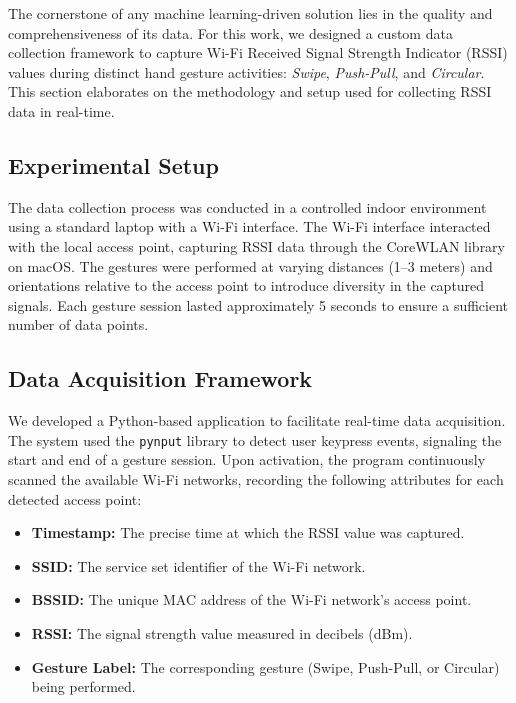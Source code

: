 \documentclass[10pt,twocolumn,letterpaper]{article}
\begin{document}
The cornerstone of any machine learning-driven solution lies in the quality and comprehensiveness of its data. For this work, we designed a custom data collection framework to capture Wi-Fi Received Signal Strength Indicator (RSSI) values during distinct hand gesture activities: \textit{Swipe}, \textit{Push-Pull}, and \textit{Circular}. This section elaborates on the methodology and setup used for collecting RSSI data in real-time.

\subsection{Experimental Setup}

The data collection process was conducted in a controlled indoor environment using a standard laptop with a Wi-Fi interface. The Wi-Fi interface interacted with the local access point, capturing RSSI data through the CoreWLAN library on macOS. The gestures were performed at varying distances (1–3 meters) and orientations relative to the access point to introduce diversity in the captured signals. Each gesture session lasted approximately 5 seconds to ensure a sufficient number of data points.

\subsection{Data Acquisition Framework}

We developed a Python-based application to facilitate real-time data acquisition. The system used the \texttt{pynput} library to detect user keypress events, signaling the start and end of a gesture session. Upon activation, the program continuously scanned the available Wi-Fi networks, recording the following attributes for each detected access point:

\begin{itemize}
    \item \textbf{Timestamp:} The precise time at which the RSSI value was captured.
    \item \textbf{SSID:} The service set identifier of the Wi-Fi network.
    \item \textbf{BSSID:} The unique MAC address of the Wi-Fi network's access point.
    \item \textbf{RSSI:} The signal strength value measured in decibels (dBm).
    \item \textbf{Gesture Label:} The corresponding gesture (Swipe, Push-Pull, or Circular) being performed.
\end{itemize}
\end{document}
